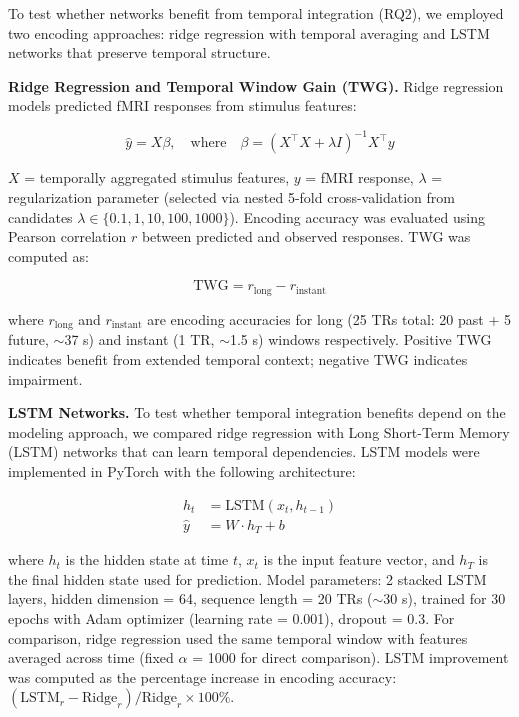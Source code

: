 \documentclass[10pt,letterpaper]{article}
\begin{document}
To test whether networks benefit from temporal integration (RQ2), we employed two encoding approaches: ridge regression with temporal averaging and LSTM networks that preserve temporal structure.

\textbf{Ridge Regression and Temporal Window Gain (TWG).} Ridge regression models predicted fMRI responses from stimulus features:

\begin{equation}
\hat{y} = X\beta, \quad \text{where} \quad \beta = (X^\top X + \lambda I)^{-1} X^\top y
\end{equation}

\noindent $X$ = temporally aggregated stimulus features, $y$ = fMRI response, $\lambda$ = regularization parameter (selected via nested 5-fold cross-validation from candidates $\lambda \in \{0.1, 1, 10, 100, 1000\}$). Encoding accuracy was evaluated using Pearson correlation $r$ between predicted and observed responses. TWG was computed as:

\begin{equation}
\text{TWG} = r_{\text{long}} - r_{\text{instant}}
\end{equation}

\noindent where $r_{\text{long}}$ and $r_{\text{instant}}$ are encoding accuracies for long (25 TRs total: 20 past + 5 future, $\sim$37 s) and instant (1 TR, $\sim$1.5 s) windows respectively. Positive TWG indicates benefit from extended temporal context; negative TWG indicates impairment.

\textbf{LSTM Networks.} To test whether temporal integration benefits depend on the modeling approach, we compared ridge regression with Long Short-Term Memory (LSTM) networks that can learn temporal dependencies. LSTM models were implemented in PyTorch with the following architecture:

\begin{align}
h_t &= \text{LSTM}(x_t, h_{t-1}) \\
\hat{y} &= W \cdot h_T + b
\end{align}

\noindent where $h_t$ is the hidden state at time $t$, $x_t$ is the input feature vector, and $h_T$ is the final hidden state used for prediction. Model parameters: 2 stacked LSTM layers, hidden dimension = 64, sequence length = 20 TRs ($\sim$30 s), trained for 30 epochs with Adam optimizer (learning rate = 0.001), dropout = 0.3. For comparison, ridge regression used the same temporal window with features averaged across time (fixed $\alpha$ = 1000 for direct comparison). LSTM improvement was computed as the percentage increase in encoding accuracy: $(\text{LSTM}_r - \text{Ridge}_r) / \text{Ridge}_r \times 100\%$.
\end{document}
